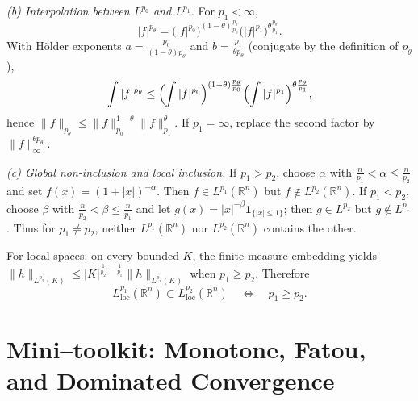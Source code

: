 \documentclass[12pt,a4paper]{article}
\theoremstyle{plain}
\theoremstyle{definition}
\theoremstyle{remark}
\theoremstyle{remark}
\newenvironment{spacy}{\begingroup\setlength{\parskip}{6pt}\setlength{\parindent}{0pt}}{\endgroup}
\theoremstyle{definition}
\begin{document}
\begin{spacy}
	\medskip
	
	\emph{(b) Interpolation between $L^{p_{0}}$ and $L^{p_{1}}$.}
	For $p_{1}<\infty$,
	\[
	|f|^{p_{\theta}}
	= \bigl(|f|^{p_{0}}\bigr)^{(1-\theta)\frac{p_{\theta}}{p_{0}}}
	\bigl(|f|^{p_{1}}\bigr)^{\theta\frac{p_{\theta}}{p_{1}}}.
	\]
	With Hölder exponents
	$a=\frac{p_{0}}{(1-\theta)p_{\theta}}$ and $b=\frac{p_{1}}{\theta p_{\theta}}$ (conjugate by the definition of $p_\theta$),
	\[
	\int |f|^{p_{\theta}}
	\le \Bigl(\int |f|^{p_{0}}\Bigr)^{(1-\theta)\frac{p_{\theta}}{p_{0}}}
	\Bigl(\int |f|^{p_{1}}\Bigr)^{\theta\frac{p_{\theta}}{p_{1}}},
	\]
	hence
	$\|f\|_{p_{\theta}}\le \|f\|_{p_{0}}^{1-\theta}\|f\|_{p_{1}}^{\theta}$.
	If $p_{1}=\infty$, replace the second factor by $\|f\|_{\infty}^{\theta p_{\theta}}$.
	
	\medskip
	
	\emph{(c) Global non-inclusion and local inclusion.}
	If $p_{1}>p_{2}$, choose $\alpha$ with $\frac{n}{p_{1}}<\alpha\le \frac{n}{p_{2}}$ and set
	$f(x)=(1+|x|)^{-\alpha}$. Then $f\in L^{p_{1}}(\mathbb R^{n})$ but $f\notin L^{p_{2}}(\mathbb R^{n})$.
	If $p_{1}<p_{2}$, choose $\beta$ with $\frac{n}{p_{2}}<\beta\le \frac{n}{p_{1}}$ and let
	$g(x)=|x|^{-\beta}\mathbf 1_{\{|x|\le1\}}$; then $g\in L^{p_{2}}$ but $g\notin L^{p_{1}}$.
	Thus for $p_{1}\ne p_{2}$, neither $L^{p_{1}}(\mathbb R^{n})$ nor $L^{p_{2}}(\mathbb R^{n})$ contains the other.
	
	For local spaces: on every bounded $K$, the finite-measure embedding yields
	$\|h\|_{L^{p_{2}}(K)}\le |K|^{\frac1{p_{2}}-\frac1{p_{1}}}\|h\|_{L^{p_{1}}(K)}$ when $p_{1}\ge p_{2}$.
	Therefore
	\[
	L^{p_{1}}_{\mathrm{loc}}(\mathbb R^{n}) \subset L^{p_{2}}_{\mathrm{loc}}(\mathbb R^{n})
	\quad\Longleftrightarrow\quad p_{1}\ge p_{2}.
	\]
\end{spacy}

\section*{Mini–toolkit: Monotone, Fatou, and Dominated Convergence}
\end{document}
